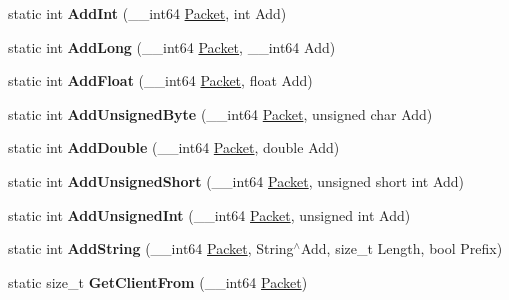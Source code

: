 \begin{DoxyCompactItemize}
\item 
\hypertarget{structmn_c_l_r_a0bebd5a04d6bab97377da625d85a03d0}{
static int {\bfseries AddInt} (\_\-\_\-int64 \hyperlink{class_packet}{Packet}, int Add)}
\label{structmn_c_l_r_a0bebd5a04d6bab97377da625d85a03d0}

\item 
\hypertarget{structmn_c_l_r_a15835e2621ec81d574714e44d638ac72}{
static int {\bfseries AddLong} (\_\-\_\-int64 \hyperlink{class_packet}{Packet}, \_\-\_\-int64 Add)}
\label{structmn_c_l_r_a15835e2621ec81d574714e44d638ac72}

\item 
\hypertarget{structmn_c_l_r_aa4c64968b8dbcb2090fedace69efd159}{
static int {\bfseries AddFloat} (\_\-\_\-int64 \hyperlink{class_packet}{Packet}, float Add)}
\label{structmn_c_l_r_aa4c64968b8dbcb2090fedace69efd159}

\item 
\hypertarget{structmn_c_l_r_a92f3c852f4b9054032793c41b9abcd96}{
static int {\bfseries AddUnsignedByte} (\_\-\_\-int64 \hyperlink{class_packet}{Packet}, unsigned char Add)}
\label{structmn_c_l_r_a92f3c852f4b9054032793c41b9abcd96}

\item 
\hypertarget{structmn_c_l_r_a1627a0ff49851b822859daff13c8fb18}{
static int {\bfseries AddDouble} (\_\-\_\-int64 \hyperlink{class_packet}{Packet}, double Add)}
\label{structmn_c_l_r_a1627a0ff49851b822859daff13c8fb18}

\item 
\hypertarget{structmn_c_l_r_ae566bcdbd33dfdf2b56734265d78bdda}{
static int {\bfseries AddUnsignedShort} (\_\-\_\-int64 \hyperlink{class_packet}{Packet}, unsigned short int Add)}
\label{structmn_c_l_r_ae566bcdbd33dfdf2b56734265d78bdda}

\item 
\hypertarget{structmn_c_l_r_a487321233973ef4c9be779720434a02d}{
static int {\bfseries AddUnsignedInt} (\_\-\_\-int64 \hyperlink{class_packet}{Packet}, unsigned int Add)}
\label{structmn_c_l_r_a487321233973ef4c9be779720434a02d}

\item 
\hypertarget{structmn_c_l_r_ad50d38d60118c1a7dda63740f1d7b52c}{
static int {\bfseries AddString} (\_\-\_\-int64 \hyperlink{class_packet}{Packet}, String$^\wedge$Add, size\_\-t Length, bool Prefix)}
\label{structmn_c_l_r_ad50d38d60118c1a7dda63740f1d7b52c}

\item 
\hypertarget{structmn_c_l_r_a524185309a5909e5af37f863dc20e38d}{
static size\_\-t {\bfseries GetClientFrom} (\_\-\_\-int64 \hyperlink{class_packet}{Packet})}
\label{structmn_c_l_r_a524185309a5909e5af37f863dc20e38d}


\end{DoxyCompactItemize}
